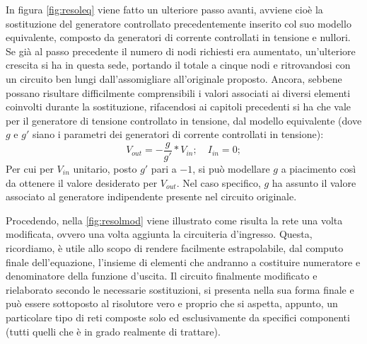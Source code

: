 In figura \ref{fig:resoleq} viene fatto un ulteriore passo avanti, avviene cioè la sostituzione del generatore controllato precedentemente inserito col suo modello equivalente, composto da generatori di corrente controllati in tensione e nullori. Se già al passo precedente il numero di nodi richiesti era aumentato, un'ulteriore crescita si ha in questa sede, portando il totale a cinque nodi e ritrovandosi con un circuito ben lungi dall'assomigliare all'originale proposto. Ancora, sebbene possano risultare difficilmente comprensibili i valori associati ai diversi elementi coinvolti durante la sostituzione, rifacendosi ai capitoli precedenti si ha che vale per il generatore di tensione controllato in tensione, dal modello equivalente (dove $g$ e $g'$ siano i parametri dei generatori di corrente controllati in tensione):
$$ V_{out} = -\frac{g}{g'}\ast V_{in};\quad I_ {in} = 0; $$
Per cui per $V_{in}$ unitario, posto $g'$ pari a $-1$, si può modellare $g$ a piacimento così da ottenere il valore desiderato per $V_{out}$. Nel caso specifico, $g$ ha assunto il valore associato al generatore indipendente presente nel circuito originale.

Procedendo, nella \ref{fig:resolmod} viene illustrato come risulta la rete una volta modificata, ovvero una volta aggiunta la circuiteria d'ingresso. Questa, ricordiamo, è utile allo scopo di rendere facilmente estrapolabile, dal computo finale dell'equazione, l'insieme di elementi che andranno a costituire numeratore e denominatore della funzione d'uscita. Il circuito finalmente modificato e rielaborato secondo le necessarie sostituzioni, si presenta nella sua forma finale e può essere sottoposto al risolutore vero e proprio che si aspetta, appunto, un particolare tipo di reti composte solo ed esclusivamente da specifici componenti (tutti quelli che è in grado realmente di trattare).

\paragraph{}


